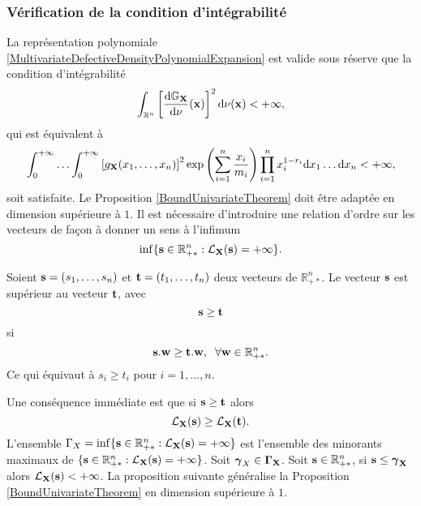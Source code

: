 \subsubsection{Vérification de la condition d'intégrabilité} 
La représentation polynomiale \eqref{MultivariateDefectiveDensityPolynomialExpansion} est valide sous réserve que la condition d'intégrabilité 
\begin{equation*}
\int_{\mathbb{R}^{n}}\left[\frac{\text{d}\mathbb{G}_{\bold{X}}}{\text{d}\nu}(\bold{x})\right]^{2}\text{d}\nu(\bold{x})<+\infty,
\end{equation*}
qui est équivalent à 
\begin{equation}\label{IntegrabilityConditionMultivariate}
\int_{0}^{+\infty}\ldots\int_{0}^{+\infty}\left[g_{\bold{X}}(x_{1},\ldots,x_{n})\right]^{2}\exp\left(\sum_{i=1}^{n}\frac{x_{i}}{m_{i}}\right)\prod_{i=1}^{n}x_{i}^{1-r_{i}}\text{d}x_{1}\ldots\text{d}x_{n}<+\infty,
\end{equation}
soit satisfaite. Le Proposition \ref{BoundUnivariateTheorem} doit être adaptée en dimension supérieure à $1$. Il est nécessaire d'introduire une relation d'ordre sur les vecteurs de façon à donner un sens à l'infimum
\begin{equation*}
\inf\{\bold{s}\in\mathbb{R}_{+*}^{n} : \mathcal{L}_{\bold{X}}(\bold{s})=+\infty\}.
\end{equation*}
\begin{Def}\label{OrderVectorRelationship}
Soient $\bold{s}=(s_{1},\ldots,s_{n})$ et $\bold{t}=(t_{1},\ldots,t_{n})$ deux vecteurs de $\mathbb{R}_{+*}^{n}$. Le vecteur $\bold{s}$ est supérieur au vecteur $\bold{t}$, avec
\begin{equation*}
\bold{s}\geq\bold{t}
\end{equation*}
si
\begin{equation}
\bold{s}.\bold{w}\geq\bold{t}.\bold{w},\hspace{0.2cm}\forall \bold{w}\in\mathbb{R}_{+*}^{n}.
\end{equation}
Ce qui équivaut à $s_{i}\geq t_{i}$ pour $i=1,\ldots,n$.
\end{Def} 
Une conséquence immédiate est que si $\bold{s}\geq\bold{t}$ alors 
\begin{equation}\label{OrderMultivariateLaplaceTransform}
\mathcal{L}_{\bold{X}}(\bold{s})\geq\mathcal{L}_{\bold{X}}(\bold{t}).
\end{equation}
L'ensemble $\Gamma_{X}=\inf\{\bold{s}\in\mathbb{R}_{+*}^{n} : \mathcal{L}_{\bold{X}}(\bold{s})=+\infty\}$ est l\rq{}ensemble des minorants maximaux de $\{\bold{s}\in\mathbb{R}_{+*}^{n} : \mathcal{L}_{\bold{X}}(\bold{s})=+\infty\}$. Soit $\boldsymbol{\gamma}_{X}\in\boldsymbol{\Gamma}_{\bold{X}}$. Soit $\bold{s}\in\mathbb{R}_{+*}^{n}$, si $\bold{s}\leq\boldsymbol{\gamma}_{\bold{X}}$ alors $\mathcal{L}_{\bold{X}}(\bold{s})<+\infty$. La proposition suivante généralise la Proposition \ref{BoundUnivariateTheorem} en dimension supérieure à $1$.
